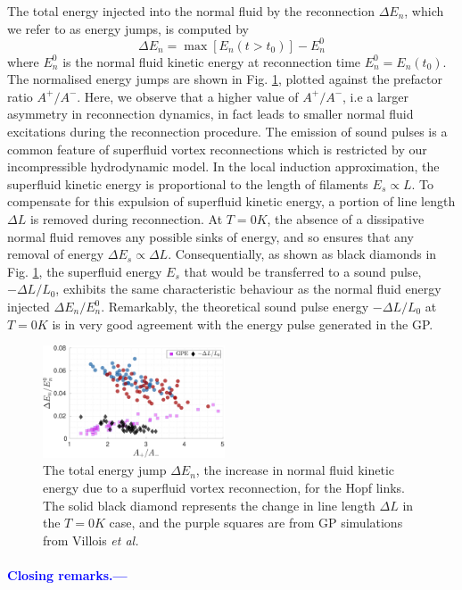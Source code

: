 \documentclass[%
 reprint,
 amsmath,amssymb,
 aps,
 prl,
]{revtex4-2}
\newcommand{\etal}{{\it et al.}~}
\def\blue#1{\textcolor{blue}{#1}}
\begin{document}
The total energy injected into the normal fluid by the reconnection $\Delta E_n$, which we refer to as energy jumps, is computed by 
\begin{equation}
	\Delta E_n = \max{\left[E_n(t>t_0)\right]} - E_n^0
\end{equation} 
where $E_n^0$ is the normal fluid kinetic energy at reconnection time $E_n^0=E_n(t_0)$. The normalised energy jumps are shown in Fig. \ref{fig: energy-jumps}, plotted against the prefactor ratio $A^+/A^-$. Here, we observe that a higher value of $A^+/A^-$, i.e a larger asymmetry in reconnection dynamics, in fact leads to smaller normal fluid excitations during the reconnection procedure. The emission of sound pulses is a common feature of superfluid vortex reconnections \cite{leadbeaterSoundEmissionDue2001b} which is restricted by our incompressible hydrodynamic model. In the local induction approximation, the superfluid kinetic energy is proportional to the length of filaments $E_s\propto L$. To compensate for this expulsion of superfluid kinetic energy, a portion of line length $\Delta L$ is removed during reconnection. At $T=0K$, the absence of a dissipative normal fluid removes any possible sinks of energy, and so ensures that any removal of energy $\Delta E_s\propto \Delta L$. Consequentially, as shown as black diamonds in Fig. \ref{fig: energy-jumps}, the superfluid energy $E_s$ that would be transferred to a sound pulse, $-\Delta L/L_0$, exhibits the same characteristic behaviour as the normal fluid energy injected $\Delta E_n/E_n^0$. Remarkably, the theoretical sound pulse energy $-\Delta L/L_0$ at $T=0K$ is in very good agreement with the energy pulse generated in the GP. 

\begin{figure}
	\centering
	\includegraphics*[width=0.48\textwidth]{energy-jump.pdf}
	\caption{The total energy jump $\Delta E_n$, the increase in normal fluid kinetic energy due to a superfluid vortex reconnection, for the Hopf links. The solid black diamond represents the change in line length $\Delta L$ in the $T=0K$ case, and the purple squares are from GP simulations from Villois \etal \cite{villoisIrreversibleDynamicsVortex2020}}
	\label{fig: energy-jumps}
\end{figure}

\blue{
\paragraph*{Closing remarks.---}
\blindtext
}

\end{document}
